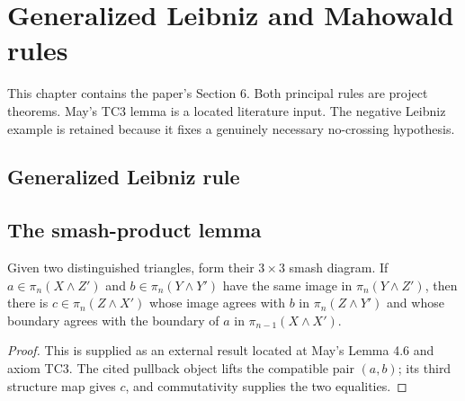 \chapter{Generalized Leibniz and Mahowald rules}
\label{chap:generalized-rules}

This chapter contains the paper's Section 6.  Both principal rules are
project theorems.  May's TC3 lemma is a located literature input.  The negative
Leibniz example is retained because it fixes a genuinely necessary
no-crossing hypothesis.

\section{Generalized Leibniz rule}









\section{The smash-product lemma}

\begin{theorem}
  \label{thm:external-may-smash-boundary}
  \notready
  Given two distinguished triangles, form their $3\times3$ smash diagram.  If
  $a\in\pi_n(X\wedge Z')$ and $b\in\pi_n(Y\wedge Y')$ have the same image in
  $\pi_n(Y\wedge Z')$, then there is
  $c\in\pi_n(Z\wedge X')$ whose image agrees with $b$ in
  $\pi_n(Z\wedge Y')$ and whose boundary agrees with the boundary of $a$ in
  $\pi_{n-1}(X\wedge X')$.
\end{theorem}

\begin{proof}
  This is supplied as an external result located at May's Lemma 4.6 and axiom
  TC3.  The cited pullback object lifts the compatible pair $(a,b)$; its third
  structure map gives $c$, and commutativity supplies the two equalities.
\end{proof}

